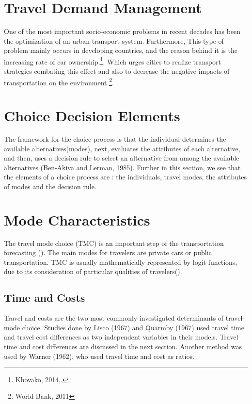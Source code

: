 \section{Travel Demand Management}
\paragraph{}One of the most important socio-economic problems in recent decades has been the optimization of an urban transport system. Furthermore, This type of problem mainly occurs in developing countries, and the reason behind it is the increasing rate of car ownership.\footnote{Khovako, 2014,.}. Which urges cities to realize transport strategies combating this effect and also to decrease the negative impacts of transportation on the environment \footnote{World Bank, 2011}.

\section{Choice Decision Elements}
The framework for the choice process is that the individual determines the available alternatives(modes), next, evaluates the attributes of each alternative, and then, uses a decision rule to select an alternative from among the available alternatives (Ben-Akiva and Lerman, 1985). Further in this section, we see that the elements of a choice process are : the individuals, travel modes, the attributes of modes and the decision rule.

\section{Mode Characteristics}
The travel mode choice (TMC) is an important step of the transportation forecasting (\cite{Litman,2011}). The main modes for travelers are private cars or public transportation. TMC is usually mathematically represented by logit functions, due to its consideration of particular qualities of travelers(\cite{Bravo et al, 2009}).
\subsection{Time and Costs}
Travel and costs are the two most commonly investigated determinants of travel-mode choice. Studies done by Lisco (1967) and Quarmby (1967) used travel time and travel cost differences as two independent variables in their models. Travel time and cost differences are discussed in the next section. Another method was used by Warner (1962), who used travel time and cost as ratios.
